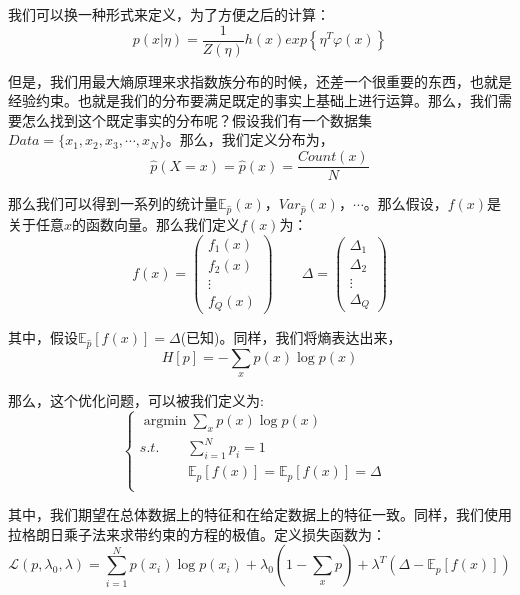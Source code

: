 \documentclass[a4paper]{article}
\DeclareMathOperator*{\argmin}{argmin}
\begin{document}
我们可以换一种形式来定义，为了方便之后的计算：
\begin{equation}
    p(x|\eta)=\frac{1}{Z(\eta)}h(x)exp\left\{ \eta^T\varphi(x) \right\}
\end{equation}

但是，我们用最大熵原理来求指数族分布的时候，还差一个很重要的东西，也就是经验约束。也就是我们的分布要满足既定的事实上基础上进行运算。那么，我们需要怎么找到这个既定事实的分布呢？假设我们有一个数据集$Data = \{x_1, x_2, x_3, \cdots, x_N\}$。那么，我们定义分布为，
\begin{equation}
    \hat{p}(X=x)=\hat{p}(x)=\frac{Count(x)}{N}
\end{equation}

那么我们可以得到一系列的统计量$\mathbb{E}_{\hat{p}}(x)$，$Var_{\hat{p}}(x)$，$\cdots$。那么假设，$f(x)$是关于任意$x$的函数向量。那么我们定义$f(x)$为：
\begin{equation}
    f(x) = 
    \begin{pmatrix}
        f_1(x) \\
        f_2(x) \\
        \vdots \\
        f_Q(x) 
    \end{pmatrix}
    \qquad
    \Delta = 
    \begin{pmatrix}
        \Delta_1 \\
        \Delta_2 \\
        \vdots \\
        \Delta_Q 
    \end{pmatrix}
\end{equation}

其中，假设$\mathbb{E}_{\hat{p}}[f(x)]=\Delta$(已知)。同样，我们将熵表达出来，
\begin{equation}
    H[p] = - \sum_x p(x)\log p(x)
\end{equation}

那么，这个优化问题，可以被我们定义为:
\begin{equation}
    \left\{
    \begin{array}{lll}
          \mathop{\argmin} \sum_x p(x)\log p(x) & \\
         s.t. \qquad \sum_{i=1}^Np_i=1 & \\
         \qquad \quad \ \ \mathbb{E}_p[f(x)]=\mathbb{E}_{\hat{p}}[f(x)]=\Delta & \\
    \end{array}
    \right.
\end{equation}

其中，我们期望在总体数据上的特征和在给定数据上的特征一致。同样，我们使用拉格朗日乘子法来求带约束的方程的极值。定义损失函数为：
\begin{equation}
    \mathcal{L}(p,\lambda_0, \lambda) = \sum_{i=1}^N p(x_i)\log p(x_i) + \lambda_0(1-\sum_{x} p)+\lambda^T(\Delta - \mathbb{E}_p[f(x)])
\end{equation}
\end{document}

